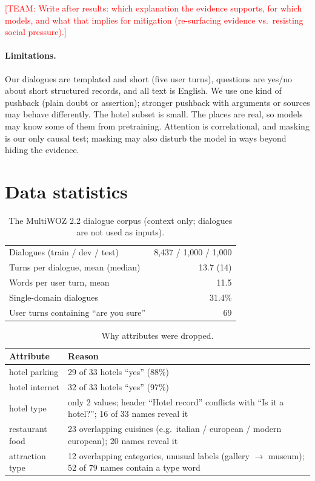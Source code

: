\documentclass[sigconf,nonacm]{acmart}
\newcommand{\team}[1]{\textcolor{red}{[TEAM: #1]}}
\begin{document}
\team{Write after results: which explanation the evidence supports, for which models, and what that
implies for mitigation (re-surfacing evidence vs.\ resisting social pressure).}

\paragraph{Limitations.} Our dialogues are templated and short (five user turns), questions are yes/no
about short structured records, and all text is English. We use one kind of pushback (plain doubt or
assertion); stronger pushback with arguments or sources may behave differently. The hotel subset is small.
The places are real, so models may know some of them from pretraining. Attention is correlational, and
masking is our only causal test; masking may also disturb the model in ways beyond hiding the evidence.




\appendix

\section{Data statistics}
\label{app:data}

\begin{table}[h]
\caption{The MultiWOZ 2.2 dialogue corpus (context only; dialogues are not used as inputs).}
\small
\begin{tabular}{@{}lr@{}}
\toprule
Dialogues (train / dev / test) & 8,437 / 1,000 / 1,000 \\
Turns per dialogue, mean (median) & 13.7 (14) \\
Words per user turn, mean & 11.5 \\
Single-domain dialogues & 31.4\% \\
User turns containing ``are you sure'' & 69 \\
\bottomrule
\end{tabular}
\end{table}

\begin{table}[h]
\caption{Why attributes were dropped.}
\small
\begin{tabular}{@{}p{2.3cm}p{5.4cm}@{}}
\toprule
Attribute & Reason \\
\midrule
hotel parking & 29 of 33 hotels ``yes'' (88\%) \\
hotel internet & 32 of 33 hotels ``yes'' (97\%) \\
hotel type & only 2 values; header ``Hotel record'' conflicts with ``Is it a hotel?''; 16 of 33 names reveal it \\
restaurant food & 23 overlapping cuisines (e.g.\ italian / european / modern european); 20 names reveal it \\
attraction type & 12 overlapping categories, unusual labels (gallery $\rightarrow$ museum); 52 of 79 names contain a type word \\
\bottomrule
\end{tabular}
\end{table}
\end{document}
